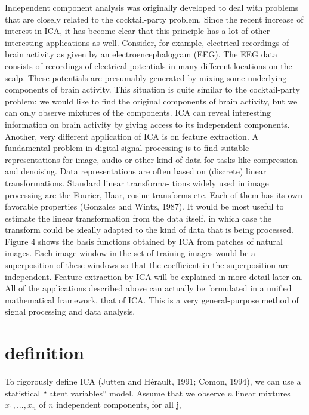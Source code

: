 \documentclass[12pt, a4paper, onecolumn]{IEEEtran}
\begin{document}
Independent component analysis was originally developed to deal with problems that are closely related to the cocktail-party problem. Since the recent increase of interest in ICA, it has become clear that this principle has a lot of other interesting applications as well.
Consider, for example, electrical recordings of brain activity as given by an electroencephalogram (EEG). The EEG data consists of recordings of electrical potentials in many different locations on the scalp. These potentials are presumably generated by mixing some underlying components of brain activity. This situation is quite similar to the cocktail-party problem: we would like to find the original components of brain activity, but we can only observe mixtures of the components. ICA can reveal interesting information on brain activity by giving access to its independent components.
Another, very different application of ICA is on feature extraction. A fundamental problem in digital signal processing is to find suitable representations for image, audio or other kind of data for tasks like compression and denoising. Data representations are often based on (discrete) linear transformations. Standard linear transforma- tions widely used in image processing are the Fourier, Haar, cosine transforms etc. Each of them has its own favorable properties (Gonzales and Wintz, 1987).
It would be most useful to estimate the linear transformation from the data itself, in which case the transform could be ideally adapted to the kind of data that is being processed. Figure 4 shows the basis functions obtained by ICA from patches of natural images. Each image window in the set of training images would be a superposition of these windows so that the coefficient in the superposition are independent. Feature extraction by ICA will be explained in more detail later on.
All of the applications described above can actually be formulated in a unified mathematical framework, that of ICA. This is a very general-purpose method of signal processing and data analysis.
\section{definition}
To rigorously define ICA (Jutten and Hérault, 1991; Comon, 1994), we can use a statistical “latent variables” model. Assume that we observe $n$ linear mixtures $x_1,...,x_n$ of $n$ independent components, for all j,
\end{document}
